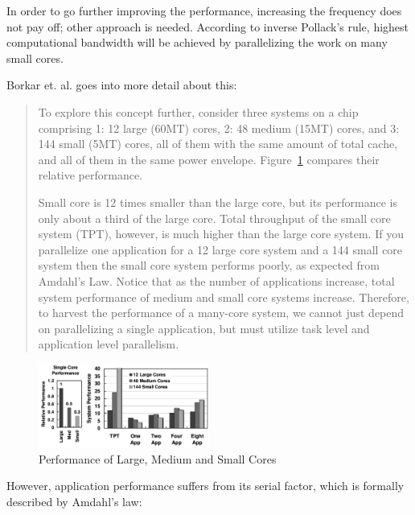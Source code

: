 \documentclass[english,11pt]{l4proj}
\begin{document}
In order to go further improving the performance, increasing the frequency does
not pay off; other approach is needed. According to inverse Pollack's
rule\cite{pollack}, highest computational bandwidth will be achieved by
parallelizing the work on many small cores\cite{1kcorechips}.

Borkar et. al. goes into more detail about this\cite{future-microprocessors}:

\begin{quote}

    To explore this concept further, consider three systems on a chip
    comprising 1: 12 large (60MT) cores, 2: 48 medium (15MT) cores, and 3: 144
    small (5MT) cores, all of them with the same amount of total cache, and all
    of them in the same power envelope. Figure~\ref{fig:core_size_performance}
    compares their relative performance.

    Small core is 12 times smaller than the large core, but its performance is
    only about a third of the large core. Total throughput of the small core
    system (TPT), however, is much higher than the large core system. If you
    parallelize one application for a 12 large core system and a 144 small core
    system then the small core system performs poorly, as expected from Amdahl’s
    Law\cite{amdahls-law}. Notice that as the number of applications increase,
    total system performance of medium and small core systems increase.
    Therefore, to harvest the performance of a many-core system, we cannot just
    depend on parallelizing a single application, but must utilize task level
    and application level parallelism.

\end{quote}

\begin{figure}[h]
    \centering
    \includegraphics[width=0.5\textwidth]{images/pollack.png}
    \caption{Performance of Large, Medium and Small
    Cores\cite{future-microprocessors}}
    \label{fig:core_size_performance}
\end{figure}

However, application performance suffers from its serial factor, which is
formally described by Amdahl's law:
\end{document}

